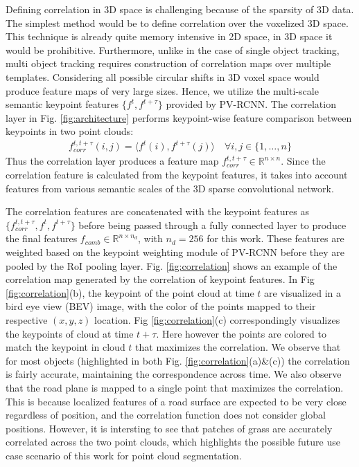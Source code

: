 \documentclass[10pt,twocolumn,letterpaper]{article}
\begin{document}
Defining correlation in 3D space is challenging because of the sparsity of 3D data. The simplest method would be to define correlation over the voxelized 3D space. This technique is already quite memory intensive in 2D space, in 3D space it would be prohibitive. Furthermore, unlike in the case of single object tracking, multi object tracking requires construction of correlation maps over multiple templates. Considering all possible circular shifts in 3D voxel space would produce feature maps of very large sizes. Hence, we utilize the multi-scale semantic keypoint features $\{f^t, f^{t+\tau}\}$ provided by PV-RCNN. The correlation layer in Fig. \ref{fig:architecture} performs keypoint-wise feature comparison between keypoints in two point clouds:
\begin{align}\label{eq:feature_corr}
   f_{corr}^{t,t+\tau}(i,j) = \langle f^t(i), f^{t+\tau}(j)\rangle\quad \forall i,j\in \{1,\ldots,n\} 
\end{align}
Thus the correlation layer produces a feature map $f_{corr}^{t,t+\tau}\in\mathbb{R}^{n\times n}$. Since the correlation feature is calculated from the keypoint features, it takes into account features from various semantic scales of the 3D sparse convolutional network.

The correlation features are concatenated with the keypoint features as $\{f_{corr}^{t,t+\tau}, f^t, f^{t+\tau}\}$ before being passed through a fully connected layer to produce the final features $f_{comb}\in\mathbb{R}^{n\times n_d}$, with $n_d=256$ for this work. These features are weighted based on the keypoint weighting module of PV-RCNN before they are pooled by the RoI pooling layer. Fig. \ref{fig:correlation} shows an example of the correlation map generated by the correlation of keypoint features. In Fig \ref{fig:correlation}(b), the keypoint of the point cloud at time $t$ are visualized in a bird eye view (BEV) image, with the color of the points mapped to their respective $(x,y,z)$ location. Fig \ref{fig:correlation}(c) correspondingly visualizes the keypoints of cloud at time $t+\tau$. Here however the points are colored to match the keypoint in cloud $t$ that maximizes the correlation. We observe that for most objects (highlighted in both Fig. \ref{fig:correlation}(a)\&(c)) the correlation is fairly accurate, maintaining the correspondence across time. We also observe that the road plane is mapped to a single point that maximizes the correlation. This is because localized features of a road surface are expected to be very close regardless of position, and the correlation function does not consider global positions. However, it is intersting to see that patches of grass are accurately correlated across the two point clouds, which highlights the possible future use case scenario of this work for point cloud segmentation.
\end{document}
